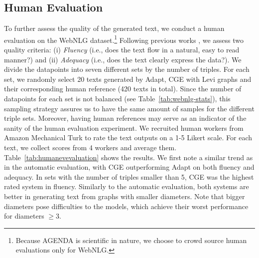 \documentclass[11pt,a4paper]{article}
\begin{document}
\subsection{Human Evaluation}
\label{sec:humaneval}
To further assess the quality of the generated text, we conduct a human evaluation on the WebNLG dataset.\footnote{Because AGENDA is scientific in nature, we choose to crowd source human evaluations only for WebNLG.} Following previous works \cite{gardent-etal-2017-webnlg, castro-ferreira-etal-2019-neural}, we assess two quality criteria: (i) \emph{Fluency} (i.e., does the text flow in a natural, easy to read manner?) and (ii) \emph{Adequacy} (i.e., does the text clearly express the data?). We divide the datapoints into seven different sets by the number of triples. For each set, we randomly select 20 texts generated by Adapt, {\selectfont CGE} with Levi graphs and their corresponding human reference (420 texts in total). Since the number of datapoints for each set is not balanced (see Table~\ref{tab:webnlg-stats}), this sampling strategy assures us to have the same amount of samples for the different triple sets. Moreover, having human references may serve as an indicator of the sanity of the human evaluation experiment. We recruited human workers from Amazon Mechanical Turk to rate the text outputs on a 1-5 Likert scale. For each text, we collect scores from 4 workers and average them. Table~\ref{tab:humanevevaluation} shows the results. We first note a similar trend as in the automatic evaluation, with {\selectfont CGE} outperforming Adapt on both fluency and adequacy. In sets with the number of triples smaller than 5, {\selectfont CGE} was the highest rated system in fluency. Similarly to the automatic evaluation, both systems are better in generating text from graphs with smaller diameters. Note that bigger diameters pose difficulties to the models, which achieve their worst performance for diameters $\geq3$.
\end{document}
